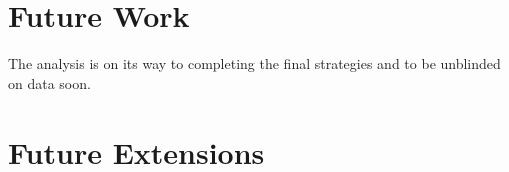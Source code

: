 \section{Future Work}
The analysis is on its way to completing the final strategies and to be unblinded on data soon.




\section{Future Extensions}

